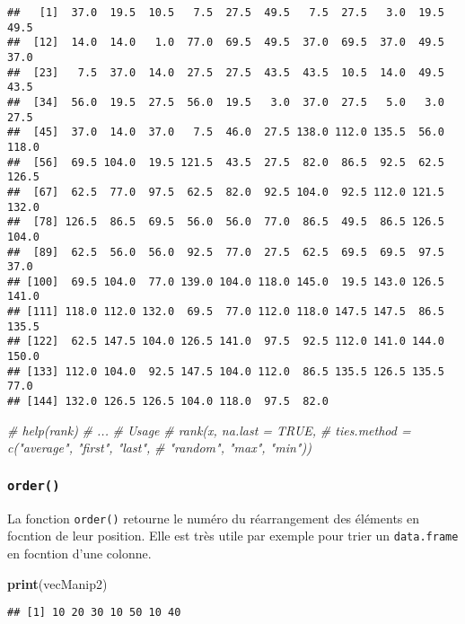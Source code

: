 \documentclass[]{book}
\newenvironment{Shaded}{\begin{snugshade}}{\end{snugshade}}
\newcommand{\KeywordTok}[1]{\textcolor[rgb]{0.13,0.29,0.53}{\textbf{#1}}}
\newcommand{\CommentTok}[1]{\textcolor[rgb]{0.56,0.35,0.01}{\textit{#1}}}
\newcommand{\NormalTok}[1]{#1}
\theoremstyle{definition}
\theoremstyle{definition}
\theoremstyle{definition}
\theoremstyle{remark}
\begin{document}
\begin{verbatim}
##   [1]  37.0  19.5  10.5   7.5  27.5  49.5   7.5  27.5   3.0  19.5  49.5
##  [12]  14.0  14.0   1.0  77.0  69.5  49.5  37.0  69.5  37.0  49.5  37.0
##  [23]   7.5  37.0  14.0  27.5  27.5  43.5  43.5  10.5  14.0  49.5  43.5
##  [34]  56.0  19.5  27.5  56.0  19.5   3.0  37.0  27.5   5.0   3.0  27.5
##  [45]  37.0  14.0  37.0   7.5  46.0  27.5 138.0 112.0 135.5  56.0 118.0
##  [56]  69.5 104.0  19.5 121.5  43.5  27.5  82.0  86.5  92.5  62.5 126.5
##  [67]  62.5  77.0  97.5  62.5  82.0  92.5 104.0  92.5 112.0 121.5 132.0
##  [78] 126.5  86.5  69.5  56.0  56.0  77.0  86.5  49.5  86.5 126.5 104.0
##  [89]  62.5  56.0  56.0  92.5  77.0  27.5  62.5  69.5  69.5  97.5  37.0
## [100]  69.5 104.0  77.0 139.0 104.0 118.0 145.0  19.5 143.0 126.5 141.0
## [111] 118.0 112.0 132.0  69.5  77.0 112.0 118.0 147.5 147.5  86.5 135.5
## [122]  62.5 147.5 104.0 126.5 141.0  97.5  92.5 112.0 141.0 144.0 150.0
## [133] 112.0 104.0  92.5 147.5 104.0 112.0  86.5 135.5 126.5 135.5  77.0
## [144] 132.0 126.5 126.5 104.0 118.0  97.5  82.0
\end{verbatim}

\begin{Shaded}
\begin{Highlighting}[]
\CommentTok{# help(rank)}
\CommentTok{# ...}
\CommentTok{# Usage}
\CommentTok{# rank(x, na.last = TRUE,}
\CommentTok{#     ties.method = c("average", "first", "last", }
\CommentTok{#       "random", "max", "min"))}
\end{Highlighting}
\end{Shaded}

\subsubsection{\texorpdfstring{\texttt{order()}}{order()}}\label{l015order}

La fonction \texttt{order()} retourne le numéro du réarrangement des
éléments en focntion de leur position. Elle est très utile par exemple
pour trier un \texttt{data.frame} en focntion d'une colonne.

\begin{Shaded}
\begin{Highlighting}[]
\KeywordTok{print}\NormalTok{(vecManip2)}
\end{Highlighting}
\end{Shaded}

\begin{verbatim}
## [1] 10 20 30 10 50 10 40
\end{verbatim}
\end{document}
